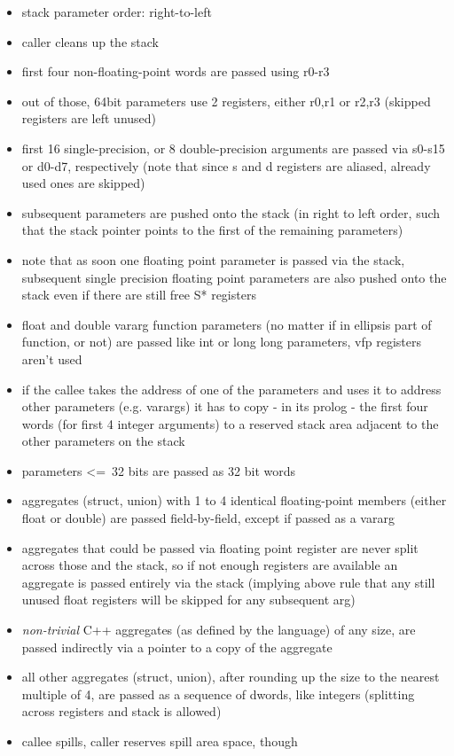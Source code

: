 \begin{itemize}
\item stack parameter order: right-to-left
\item caller cleans up the stack
\item first four non-floating-point words are passed using r0-r3
\item out of those, 64bit parameters use 2 registers, either r0,r1 or r2,r3 (skipped registers are left unused)
\item first 16 single-precision, or 8 double-precision arguments are passed via s0-s15 or d0-d7, respectively (note that since s and d registers are aliased, already used ones are skipped)
\item subsequent parameters are pushed onto the stack (in right to left order, such that the stack pointer points to the first of the remaining parameters)
\item note that as soon one floating point parameter is passed via the stack, subsequent single precision floating point parameters are also pushed onto the stack even if there are still free S* registers
\item float and double vararg function parameters (no matter if in ellipsis part of function, or not) are passed like int or long long parameters, vfp registers aren't used
\item if the callee takes the address of one of the parameters and uses it to address other parameters (e.g. varargs) it has to copy - in its prolog - the first four words (for first 4 integer arguments) to a reserved stack area adjacent to the other parameters on the stack
\item parameters \textless=\ 32 bits are passed as 32 bit words
\item aggregates (struct, union) with 1 to 4 identical floating-point members (either float or double) are passed field-by-field, except if passed as a vararg
\item aggregates that could be passed via floating point register are never split across those and the stack, so if not enough registers are available an aggregate is
passed entirely via the stack (implying above rule that any still unused float registers will be skipped for any subsequent arg)
\item {\it non-trivial} C++ aggregates (as defined by the language) of any size, are passed indirectly via a pointer to a copy of the aggregate
\item all other aggregates (struct, union), after rounding up the size to the nearest multiple of 4, are passed as a sequence of dwords, like integers (splitting across registers and stack is allowed)
\item callee spills, caller reserves spill area space, though
\end{itemize}

